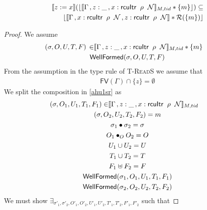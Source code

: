  \begin{lemma}
   \label{lemma:readstack}
\begin{align*}
  \llbracket z:=x \rrbracket (\lfloor \llbracket \Gamma\,, z:\_ \, ,\rcuitrT{x}{G}{k}{k+1}{\_} \rrbracket_{M,tid} * \{m\}\rfloor)  \subseteq \\
                                                              \lfloor \llbracket \Gamma\,, \rcuitrT{x}{G}{k}{k+1}{\_}\, , \rcuitrT{z}{G}{k}{k+1}{\_}  \rrbracket  * \mathcal{R}(\{m\})\rfloor
\end{align*}
 \end{lemma}
 \begin{proof}
We assume
\begin{gather}\label{ahu1sr}
  \begin{aligned}
    (\sigma, O, U, T,F) \, \in &  \llbracket \Gamma\,, z:\_ \, ,\rcuitrT{x}{G}{k}{k+1}{\_} \rrbracket_{M,tid} * \{m\}
    \end{aligned} \\
\textsf{WellFormed}(\sigma,O,U,T,F)
\label{ahu2sr}
\end{gather}
From the assumption in the type rule of \textsc{T-ReadS} we assume that
\begin{gather}
\textsf{FV}(\Gamma) \cap \{z\}  =\emptyset 
  \label{ahu3sr}
\end{gather}
We split the composition in  \ref{ahu1sr} as 
\begin{gather} \label{ahu11sr}
  \begin{aligned}
    (\sigma, O_{1}, U_{1}, T_{1} ,F_1) \in & \llbracket  \Gamma\,, z:\_ \, ,\rcuitrT{x}{G}{k}{k+1}{\_} \rrbracket_{M,tid} \end{aligned}\\
\label{ahu12sr}
(\sigma, O_{2}, U_{2}, T_{2}, F_2) = m
\\
\label{ahusigsr}
\sigma_1 \bullet \sigma_2 = \sigma
\\
\label{ahu13sr}
O_{1} \bullet_{O} O_{2} = O
\\
\label{ahu14sr}
U_{1} \cup U_{2} = U
\\
\label{ahu15sr}
T_{1} \cup T_{2} = T
\\
\label{ahusrf}
F_1 \uplus F_2 = F
\\
\label{ahu16sr}
\textsf{WellFormed}(\sigma_1,O_{1},U_{1},T_{1},F_1)
\\
\label{ahu17sr}
\textsf{WellFormed}(\sigma_2,O_{2},U_{2},T_{2},F_2)
\end{gather}
We must show $\exists_{\sigma'_1, \sigma'_2, O'_{1}, O'_{2}, U'_{1}, U'_{2}, T'_{1}, T'_{2}, F'_1 , F'_2}$ such that

\end{proof}

